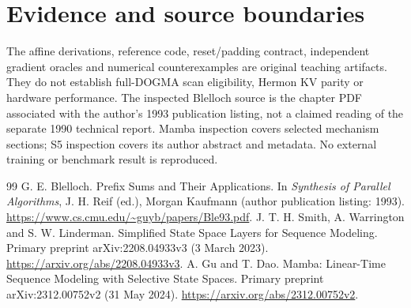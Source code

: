 \chapter*{Evidence and source boundaries}
The affine derivations, reference code, reset/padding contract, independent gradient
oracles and numerical counterexamples are original teaching artifacts. They do not
establish full-DOGMA scan eligibility, Hermon KV parity or hardware performance.
The inspected Blelloch source is the chapter PDF associated with the author's
1993 publication listing, not a claimed reading of the separate 1990 technical report.
Mamba inspection covers selected mechanism sections; S5 inspection covers its
author abstract and metadata. No external training or benchmark result is reproduced.
\begin{thebibliography}{99}
 G. E. Blelloch. Prefix Sums and Their Applications.
In \emph{Synthesis of Parallel Algorithms}, J. H. Reif (ed.), Morgan Kaufmann
(author publication listing: 1993).
\url{https://www.cs.cmu.edu/~guyb/papers/Ble93.pdf}.
 J. T. H. Smith, A. Warrington and S. W. Linderman.
Simplified State Space Layers for Sequence Modeling.
Primary preprint arXiv:2208.04933v3 (3 March 2023).
\url{https://arxiv.org/abs/2208.04933v3}.
 A. Gu and T. Dao.
Mamba: Linear-Time Sequence Modeling with Selective State Spaces.
Primary preprint arXiv:2312.00752v2 (31 May 2024).
\url{https://arxiv.org/abs/2312.00752v2}.
\end{thebibliography}
